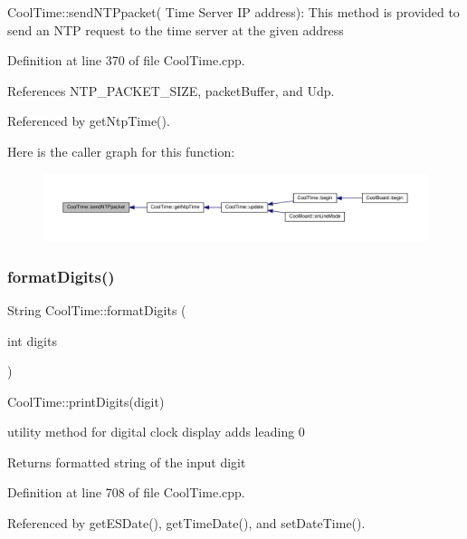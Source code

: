 Cool\+Time\+::send\+N\+T\+Ppacket( Time Server I\+P address)\+: This method is provided to send an N\+TP request to the time server at the given address 

Definition at line 370 of file Cool\+Time.\+cpp.



References N\+T\+P\+\_\+\+P\+A\+C\+K\+E\+T\+\_\+\+S\+I\+ZE, packet\+Buffer, and Udp.



Referenced by get\+Ntp\+Time().

Here is the caller graph for this function\+:
\nopagebreak
\begin{figure}[H]
\begin{center}
\leavevmode
\includegraphics[width=350pt]{d6/d49/class_cool_time_a236a38d120dc53bc67456d763838c5a1_icgraph}
\end{center}
\end{figure}
\mbox{\label{class_cool_time_acd537cd4210d7bde4e1f5c47d2ac0456}} 
\subsubsection{\texorpdfstring{format\+Digits()}{formatDigits()}}
{\footnotesize\ttfamily String Cool\+Time\+::format\+Digits (\begin{DoxyParamCaption}\item[{int}]{digits }\end{DoxyParamCaption})}

Cool\+Time\+::print\+Digits(digit)

utility method for digital clock display adds leading 0

\begin{DoxyReturn}{Returns}
formatted string of the input digit 
\end{DoxyReturn}


Definition at line 708 of file Cool\+Time.\+cpp.



Referenced by get\+E\+S\+Date(), get\+Time\+Date(), and set\+Date\+Time().


